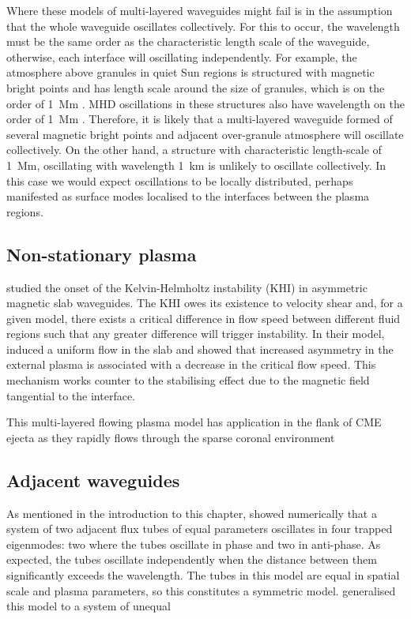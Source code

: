 \documentclass[12pt,draft]{../style-files/ociamthesis}
\begin{document}
Where these models of multi-layered waveguides might fail is in the assumption that the whole waveguide oscillates collectively. For this to occur, the wavelength must be the same order as the characteristic length scale of the waveguide, otherwise, each interface will oscillating independently. For example, the atmosphere above granules in quiet Sun regions is structured with magnetic bright points and has length scale around the size of granules, which is on the order of 1~Mm \citep{ras03}. MHD oscillations in these structures also have wavelength on the order of 1~Mm \citep{jaf_etal17}. Therefore, it is likely that a multi-layered waveguide formed of several magnetic bright points and adjacent over-granule atmosphere will oscillate collectively. On the other hand, a structure with characteristic length-scale of 1~Mm, oscillating with wavelength 1~km is unlikely to oscillate collectively. In this case we would expect oscillations to be locally distributed, perhaps manifested as surface modes localised to the interfaces between the plasma regions.


\subsection{Non-stationary plasma}
\cite{bar_etal18} studied the onset of the Kelvin-Helmholtz instability (KHI) in asymmetric magnetic slab waveguides. The KHI owes its existence to velocity shear and, for a given model, there exists a critical difference in flow speed between different fluid regions such that any greater difference will trigger instability. In their model, \cite{bar_etal18} induced a uniform flow in the slab and showed that increased asymmetry in the external plasma is associated with a decrease in the critical flow speed. This mechanism works counter to the stabilising effect due to the magnetic field tangential to the interface.

This multi-layered flowing plasma model has application in the flank of CME ejecta as they rapidly flows through the sparse coronal environment \citep{fou_etal11}


\subsection{Adjacent waveguides}
As mentioned in the introduction to this chapter, \cite{lun_etal08} showed numerically that a system of two adjacent flux tubes of equal parameters oscillates in four trapped eigenmodes: two where the tubes oscillate in phase and two in anti-phase. As expected, the tubes oscillate independently when the distance between them significantly exceeds the wavelength. The tubes in this model are equal in spatial scale and plasma parameters, so this constitutes a symmetric model. \cite{van_etal08} generalised this model to a system of unequal 
\end{document}
